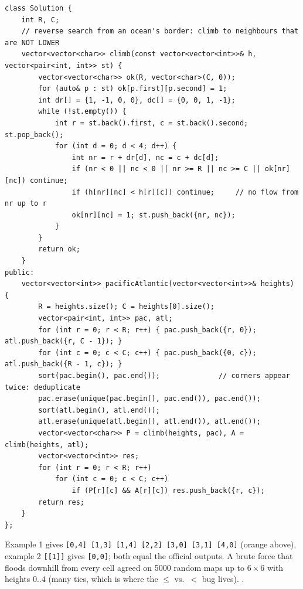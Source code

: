 \begin{solutionbox}
\begin{lstlisting}[style=cpp]
class Solution {
    int R, C;
    // reverse search from an ocean's border: climb to neighbours that are NOT LOWER
    vector<vector<char>> climb(const vector<vector<int>>& h, vector<pair<int, int>> st) {
        vector<vector<char>> ok(R, vector<char>(C, 0));
        for (auto& p : st) ok[p.first][p.second] = 1;
        int dr[] = {1, -1, 0, 0}, dc[] = {0, 0, 1, -1};
        while (!st.empty()) {
            int r = st.back().first, c = st.back().second; st.pop_back();
            for (int d = 0; d < 4; d++) {
                int nr = r + dr[d], nc = c + dc[d];
                if (nr < 0 || nc < 0 || nr >= R || nc >= C || ok[nr][nc]) continue;
                if (h[nr][nc] < h[r][c]) continue;     // no flow from nr up to r
                ok[nr][nc] = 1; st.push_back({nr, nc});
            }
        }
        return ok;
    }
public:
    vector<vector<int>> pacificAtlantic(vector<vector<int>>& heights) {
        R = heights.size(); C = heights[0].size();
        vector<pair<int, int>> pac, atl;
        for (int r = 0; r < R; r++) { pac.push_back({r, 0}); atl.push_back({r, C - 1}); }
        for (int c = 0; c < C; c++) { pac.push_back({0, c}); atl.push_back({R - 1, c}); }
        sort(pac.begin(), pac.end());              // corners appear twice: deduplicate
        pac.erase(unique(pac.begin(), pac.end()), pac.end());
        sort(atl.begin(), atl.end());
        atl.erase(unique(atl.begin(), atl.end()), atl.end());
        vector<vector<char>> P = climb(heights, pac), A = climb(heights, atl);
        vector<vector<int>> res;
        for (int r = 0; r < R; r++)
            for (int c = 0; c < C; c++)
                if (P[r][c] && A[r][c]) res.push_back({r, c});
        return res;
    }
};
\end{lstlisting}
Example 1 gives \texttt{[0,4] [1,3] [1,4] [2,2] [3,0] [3,1] [4,0]} (orange above), example 2 \texttt{[[1]]} gives \texttt{[0,0]}; both equal the official outputs. A brute force that floods downhill from every cell agreed on 5000 random maps up to $6 \times 6$ with heights $0..4$ (many ties, which is where the $\le$ vs.\ $<$ bug lives). .
\end{solutionbox}

